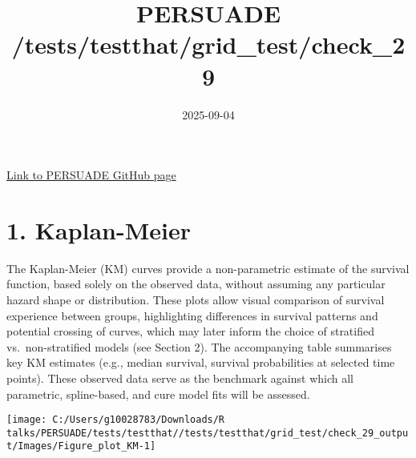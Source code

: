 \documentclass[
]{article}
\title{PERSUADE /tests/testthat/grid\_test/check\_29}
\author{}
\date{\vspace{-2.5em}2025-09-04}
\begin{document}
\maketitle

{
\hypersetup{linkcolor=}
\setcounter{tocdepth}{2}
\tableofcontents
}
\hfill\break

\href{https://github.com/Bram-R/PERSUADE}{Link to PERSUADE GitHub page}

\clearpage

\section{1. Kaplan-Meier}\label{kaplan-meier}

The Kaplan-Meier (KM) curves provide a non-parametric estimate of the
survival function, based solely on the observed data, without assuming
any particular hazard shape or distribution. These plots allow visual
comparison of survival experience between groups, highlighting
differences in survival patterns and potential crossing of curves, which
may later inform the choice of stratified vs.~non-stratified models (see
Section 2). The accompanying table summarises key KM estimates (e.g.,
median survival, survival probabilities at selected time points). These
observed data serve as the benchmark against which all parametric,
spline-based, and cure model fits will be assessed.

\clearpage

\begin{flushleft}\texttt{[image: C:/Users/g10028783/Downloads/R talks/PERSUADE/tests/testthat//tests/testthat/grid\_test/check\_29\_output/Images/Figure\_plot\_KM-1]} \end{flushleft}

\begin{table}[H]
\centering
\caption{\label{tab:Table_1}Observed survival data}
\centering
{}
\end{table}
\end{document}

